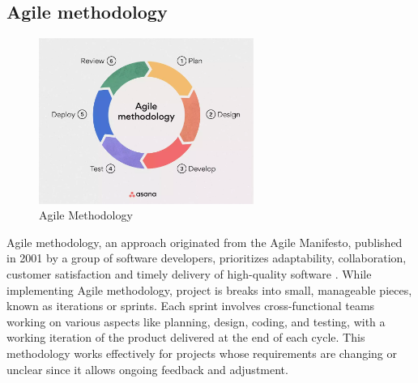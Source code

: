 \subsection{Agile methodology}
\begin{figure}[H]
    \centering
    \includegraphics[width=7cm]{Images/agile.png}
    \caption{Agile Methodology \citep{laoyan_2022_what}}
    \label{fig:agile}
\end{figure}
Agile methodology, an approach originated from the Agile Manifesto, published in 2001 by a group of software developers, prioritizes adaptability, collaboration, customer satisfaction and timely delivery of high-quality software \citep{laoyan_2022_what}.
While implementing Agile methodology, project is breaks into small, manageable pieces, known as iterations or sprints.
Each sprint involves cross-functional teams working on various aspects like planning, design, coding, and testing, with a working iteration of the product delivered at the end of each cycle. 
This methodology works effectively for projects whose requirements are changing or unclear since it allows ongoing feedback and adjustment. 

